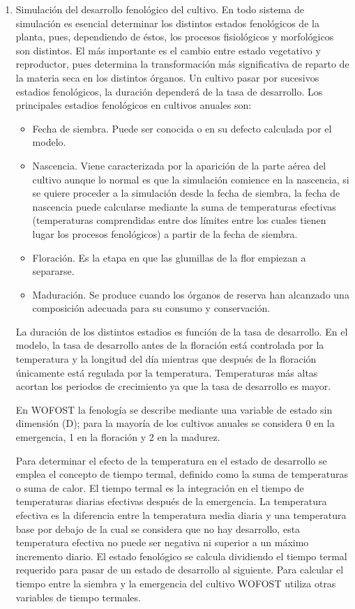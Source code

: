 \begin{enumerate}
	\item Simulación del desarrollo fenológico del cultivo. En todo sistema de simulación es esencial determinar los distintos estados fenológicos de la planta, pues, dependiendo de éstos, los procesos fisiológicos y morfológicos son distintos. El más importante es el cambio entre estado vegetativo y reproductor, pues determina la transformación más significativa de reparto de la materia seca en los distintos órganos. Un cultivo pasar por sucesivos estadios fenológicos, la duración dependerá de la tasa de desarrollo. Los principales estadios fenológicos en cultivos anuales son:
	\begin{itemize}
		\item Fecha de siembra. Puede ser conocida o en su defecto calculada por el modelo. 
		\item Nascencia. Viene caracterizada por la aparición de la parte aérea del cultivo aunque lo normal es que la simulación comience en la nascencia, si se quiere proceder a la simulación desde la fecha de siembra, la fecha de nascencia puede calcularse mediante la suma de temperaturas efectivas (temperaturas comprendidas entre dos límites entre los cuales tienen lugar los procesos fenológicos) a partir de la fecha de siembra.
		\item Floración. Es la etapa en que las glumillas de la flor empiezan a separarse.
		\item Maduración. Se produce cuando los órganos de reserva han alcanzado una composición adecuada para su consumo y conservación. 
	\end{itemize}
	La duración de los distintos estadios es función de la tasa de desarrollo. En el modelo, la tasa de desarrollo antes de la floración está controlada por la temperatura y la longitud del día mientras que después de la floración únicamente está regulada por la temperatura. Temperaturas más altas acortan los periodos de crecimiento ya que la tasa de desarrollo es mayor.
	
	En WOFOST la fenología se describe mediante una variable de estado sin dimensión (D); para la mayoría de los cultivos anuales se considera 0 en la emergencia, 1 en la floración y 2 en la madurez. 
	
	Para determinar el efecto de la temperatura en el estado de desarrollo se emplea el concepto de tiempo termal, definido como la suma de temperaturas o suma de calor. El tiempo termal es la integración en el tiempo de temperaturas diarias efectivas después de la emergencia. La temperatura efectiva es la diferencia entre la temperatura media diaria y una temperatura base por debajo de la cual se considera que no hay desarrollo, esta temperatura efectiva no puede ser negativa ni superior a un máximo incremento diario. El estado fenológico se calcula dividiendo el tiempo termal requerido para pasar de un estado de desarrollo al siguiente. Para calcular el tiempo entre la siembra y la emergencia del cultivo WOFOST utiliza otras variables de tiempo termales.
	

\end{enumerate}
